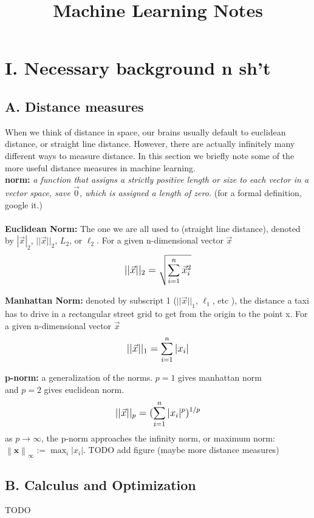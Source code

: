 \documentclass[10pt]{article}
\begin{document}
\title{Machine Learning Notes}
\maketitle

\section*{I. Necessary background n sh't}
	\subsection*{A. Distance measures}
		When we think of distance in space, our brains usually default to euclidean distance, or straight line distance. 
		However, there are actually infinitely many different ways to measure distance. In this section we briefly
		note some of the more useful distance measures in machine learning. \\
		
		\noindent \textbf{norm:}\textit{ a function that assigns a strictly positive length or size to each vector in a 
		vector space, save $\vec{0}$, which is assigned a length of zero.} (for a formal definition, google it.) \\ \\
    		
		\indent \textbf{Euclidean Norm:} The one we are all used to (straight line distance), 
		\indent denoted by $ |\vec x|_2 $, $ ||\vec x||_2$, $L_2$, or $\ell_2 $. For a given n-dimensional vector $\vec x$
			$$  \mathlarger{||\vec x||_2 = \sqrt {\sum_{i=1}^n \vec x_i^2} } $$
		
		\indent \textbf{Manhattan Norm:} denoted by subscript 1 ($ ||\vec x||_1$,  $\ell_1$, etc ), the distance 
		\indent a taxi has to drive in a rectangular street grid to get from the origin to 
		\indent the point x. For a given n-dimensional vector $\vec x$
		$$  \mathlarger{ ||\vec x||_1 = \sum_{i=1}^n | x_i | }$$
		
		\textbf{p-norm:} a generalization of the norms. $p = 1$ gives manhattan norm \\
		\indent and $p=2$ gives euclidean norm. 
		$$ \mathlarger{ ||\vec x||_p = (\sum_{i=1}^n | x_i |^p)^{1/p}} $$
		\indent as $p \rightarrow \infty $, the p-norm approaches the infinity norm, or maximum norm:
		\indent $ \left\|\mathbf {x} \right\|_{\infty }:=\max _{i}\left|x_{i}\right|. $
		TODO add figure (maybe more distance measures)
		\subsection*{B. Calculus and Optimization}
			TODO
\end{document}
